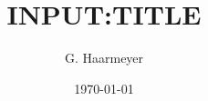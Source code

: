 \documentclass{book}
\begin{document}
\title{{{INPUT:TITLE}}}
\author{G. Haarmeyer}
\date{\today}
\maketitle

\tableofcontents
\newpage



\end{document}
